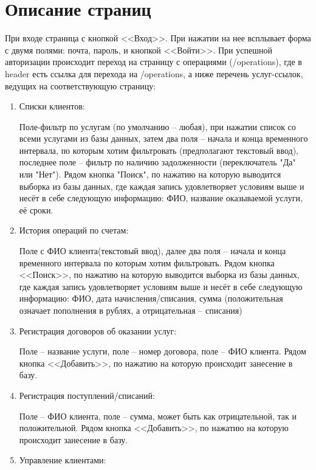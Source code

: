 \documentclass[oneside,senior,etd]{BYUPhysForDegree}
\begin{document}
\fixmargins
\makepreliminarypages
\oneandhalfspace

\newpage 
 
\newpage
\section{Описание страниц}

При входе страница с кнопкой <<Вход>>. При нажатии на нее всплывает форма с двумя полями: почта, пароль, и кнопкой <<Войти>>. При успешной авторизации происходит переход на страницу с операциями (/operations), где в header есть ссылка для перехода на /operations, а ниже перечень услуг-ссылок, ведущих на соответствующую страницу:
\begin{enumerate}
    \item Списки клиентов:
    
    Поле-фильтр по услугам (по умолчанию -- любая), при нажатии список со всеми услугами из базы данных, затем два поля -- начала и конца временного интервала, по которым хотим фильтровать (предполагают текстовый ввод), последнее поле -- фильтр по наличию задолженности (переключатель "Да" или "Нет"). Рядом кнопка "Поиск", по нажатию на которую выводится выборка из базы данных, где каждая запись удовлетворяет условиям выше и несёт в себе следующую информацию: ФИО, название оказываемой услуги, её сроки.
    
    \item История операций по счетам:
    
    Поле с ФИО клиента(текстовый ввод), далее два поля -- начала и конца временного интервала по которым хотим фильтровать. Рядом кнопка <<Поиск>>, по нажатию на которую выводится выборка из базы данных, где каждая запись удовлетворяет условиям выше и несёт в себе следующую информацию: 
    ФИО, дата начисления/списания, сумма (положительная означает пополнения в рублях, а отрицательная -- списания)
    \item Регистрация договоров об оказании услуг:
    
    Поле -- название услуги, поле -- номер договора, поле -- ФИО клиента. Рядом кнопка <<Добавить>>, по нажатию на которую происходит занесение в базу.
    \item Регистрация поступлений/списаний:
    
    Поле -- ФИО клиента, поле -- сумма, может быть как отрицательной, так и положительной. Рядом кнопка <<Добавить>>, по нажатию на которую происходит занесение в базу.
\newpage
    \item Управление клиентами:
    

\end{enumerate}
\end{document}
